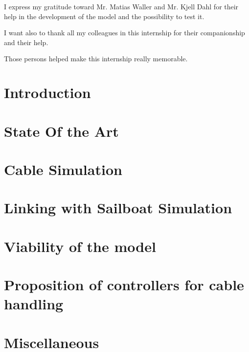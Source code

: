 \documentclass[twoside,12pt]{report} %
\begin{document}
I express my gratitude toward Mr. Matias Waller and Mr. Kjell Dahl for their help in the development of the model and the possibility to test it.

I want also to thank all my colleagues in this internship for their companionship and their help. 

Those persons helped make this internship really memorable.


\tableofcontents  %

\listoffigures  %
\listoftables   %


\chapter*{Introduction}


\chapter{State Of the Art}

\chapter{Cable Simulation}


\chapter{Linking with Sailboat Simulation}


\chapter{Viability of the model}



\chapter{Proposition of controllers for cable handling}



\chapter{Miscellaneous}

\end{document}
